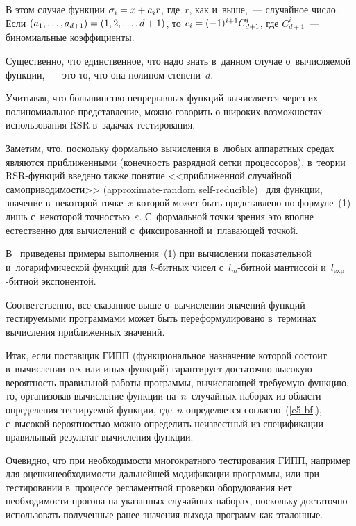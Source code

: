 \begin{multicols}{2}
    {В этом случае функции $\sigma_i\hm = x\hm+ a_ir$, где~$r$, как 
и~выше,~--- случайное число. Если $(a_1, \ldots, a_{d+1}) \hm= (1, 2, \ldots, 
d+1)$, то $c_i\hm = (-1)^{i+1}C^i_{d+1}$, где $C^i_{d+1}$~--- биномиальные 
коэффициенты.}
    
    
    Существенно, что единственное, что надо знать в~данном случае 
о~вычисляемой функции,~--- это то, что она полином степени~$d$.
    
    Учитывая, что большинство непрерывных функций вычисляется через 
их полиномиальное представление, можно говорить о широких 
возможностях использования RSR в~задачах тестирования.
    
    Заметим, что, поскольку формально вычисления в~любых аппаратных 
средах являются при\-ближенными (конечность разрядной сетки про\-цессоров), 
в~теории RSR-функ\-ций введено также\linebreak
 понятие <<приближенной случайной 
самоприводимости>> (approximate-random self-reducible)~\cite{12-bf} для 
функции, значение в~некоторой точке~$x$ которой может быть представлено 
по формуле~(1) лишь с~некоторой точностью~$\varepsilon$. С~формальной 
точки зрения это вполне естественно для вычислений с~фиксированной 
и~плавающей точкой.

    В~\cite{12-bf} приведены примеры выполнения~(1) при вычислении 
показательной и~логарифмической функций для $k$-бит\-ных чисел  
с~$l_m$-бит\-ной мантиссой и~$l_{\mathrm{exp}}$-бит\-ной экспонентой.
    
    Соответственно, все сказанное выше о~вы\-чис\-ле\-нии значений функций 
тестируемыми программами может быть переформулировано в~терминах 
вычисления приближенных значений.
    
    Итак, если поставщик ГИПП (функциональное назначение которой 
состоит в~вычислении тех или иных функций) гарантирует достаточно 
высокую вероятность правильной работы программы, вычисляющей 
требуемую функцию, то, организовав вычисление функции 
на~$n$~случайных наборах из области определения тестируемой функции, где~$n$ 
определяется согласно~(\ref{e5-bf}), с~высокой вероятностью можно 
определить неизвестный из спецификации правильный результат вычисления 
функции.
    
    Очевидно, что при необходимости многократ\-ного тестирования ГИПП, 
например для оценки\linebreak не\-об\-хо\-ди\-мости дальнейшей модификации программы, 
или при тестировании в~процессе регла\-мент\-ной проверки оборудования нет 
не\-об\-хо\-ди\-мости прогона на указанных случайных наборах, поскольку 
достаточно использовать полученные ранее значения выхода программ как 
эталонные.


\end{multicols}
